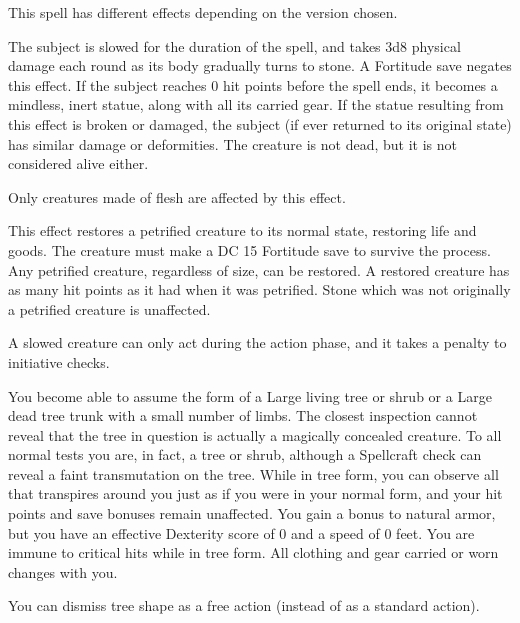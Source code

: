 \spellrng{\rngmed}
\begin{spelleffect}
  This spell has different effects depending on the version chosen.
  \par {} The subject is slowed for the duration of the spell, and takes 3d8 physical damage each round as its body gradually turns to stone. A Fortitude save negates this effect. If the subject reaches 0 hit points before the spell ends, it becomes a mindless, inert statue, along with all its carried gear. If the statue resulting from this effect is broken or damaged, the subject (if ever returned to its original state) has similar damage or deformities. The creature is not dead, but it is not considered alive either.
  \par Only creatures made of flesh are affected by this effect.
  \par {} This effect restores a petrified creature to its normal state, restoring life and goods. The creature must make a DC 15 Fortitude save to survive the process. Any petrified creature, regardless of size, can be restored. A restored creature has as many hit points as it had when it was petrified. Stone which was not originally a petrified creature is unaffected.
\end{spelleffect}
\begin{spellnotes}
 A slowed creature can only act during the action phase, and it takes a  penalty to initiative checks.
\end{spellnotes}

\begin{spelleffect}
  You become able to assume the form of a Large living tree or shrub or a Large dead tree trunk with a small number of limbs. The closest inspection cannot reveal that the tree in question is actually a magically concealed creature. To all normal tests you are, in fact, a tree or shrub, although a Spellcraft check can reveal a faint transmutation on the tree. While in tree form, you can observe all that transpires around you just as if you were in your normal form, and your hit points and save bonuses remain unaffected. You gain a  bonus to natural armor, but you have an effective Dexterity score of 0 and a speed of 0 feet. You are immune to critical hits while in tree form. All clothing and gear carried or worn changes with you.
\end{spelleffect}
\begin{spellnotes}
  You can dismiss tree shape as a free action (instead of as a standard action).
\end{spellnotes}

